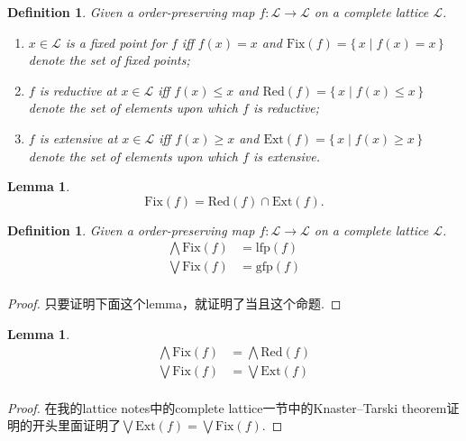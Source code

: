 \documentclass{article}
\newtheorem{lemma}[theorem]{Lemma}
\newtheorem{definition}[theorem]{Definition}
\newcommand*{\xfunc}[4]{{#2}\colon{#3}{#1}{#4}}
\newcommand*{\func}[3]{\xfunc{\to}{#1}{#2}{#3}}
\newcommand\Set[2]{\{\,#1\mid#2\,\}} %
\begin{document}
\begin{definition}
\rm Given a order-preserving map $\func{f}{\mathcal{L}}{\mathcal{L}}$ on a complete lattice $\mathcal{L}$. 
\begin{enumerate}
	\item $x \in \mathcal{L}$ is a {\color{red} fixed point} for $f$ iff $f(x) = x$ and $\text{Fix}(f) = \Set{x}{f(x) = x}$ denote the set of fixed points;
	\item $f$ is {\color{red} reductive} at $x \in \mathcal{L}$ iff $f(x) \leq x$ and $\text{Red}(f) = \Set{x}{f(x) \leq x}$ denote the set of elements upon which $f$ is reductive;
	\item $f$ is {\color{red} extensive} at $x \in \mathcal{L}$ iff $f(x) \geq x$ and $\text{Ext}(f) = \Set{x}{f(x) \geq x}$ denote the set of elements upon which $f$ is extensive.
\end{enumerate}
\end{definition}


\begin{lemma} \rm
$$
\text{Fix}(f) = \text{Red}(f) \cap \text{Ext}(f). 
$$
\end{lemma}

\begin{definition}
\rm Given a order-preserving map $\func{f}{\mathcal{L}}{\mathcal{L}}$ on a complete lattice $\mathcal{L}$.
$$
\begin{aligned}
\bigwedge \text{Fix}(f) &= \text{lfp}(f) \\
\bigvee \text{Fix}(f) &= \text{gfp}(f) \\
\end{aligned}
$$
\end{definition}

\begin{proof}
\rm 只要证明下面这个lemma，就证明了当且这个命题. 
\end{proof}


\begin{lemma}\label{fixpoint-bound}
\rm 
$$
\begin{aligned}
\bigwedge \text{Fix}(f) &= \bigwedge \text{Red}(f) \\
\bigvee \text{Fix}(f) &= \bigvee \text{Ext}(f) \\
\end{aligned}
$$
\end{lemma}

\begin{proof}
在我的lattice notes中的complete lattice一节中的Knaster–Tarski theorem证明的开头里面证明了$\bigvee \text{Ext}(f) = \bigvee \text{Fix}(f)$.
\end{proof}
\end{document}
